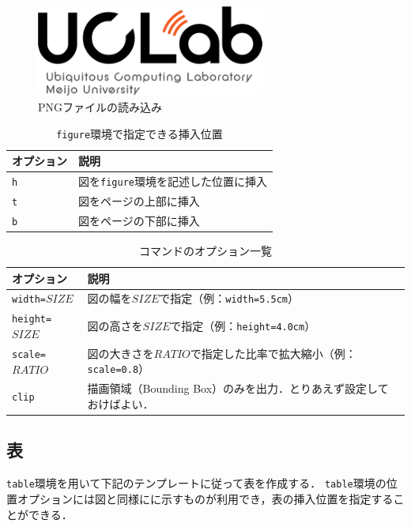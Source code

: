 \documentclass[a4j,11pt]{ujreport}
\begin{document}
\begin{figure}[ht]
	\centering
	\includegraphics[clip,height=3.0cm]{fig/logo.png}
	\caption{PNGファイルの読み込み}
	\label{fig:ExamplePNG}
\end{figure}

\begin{table}[ht]
	\centering
	\caption{\texttt{figure}環境で指定できる挿入位置}
	\label{tab:FigureOptions}
	\small
	\begin{tabular}{l|l}
		\Hline 
		オプション & 説明 \\ 
		\hline\hline
		\texttt{h} & 図を\texttt{figure}環境を記述した位置に挿入\\
		\texttt{t} & 図をページの上部に挿入\\
		\texttt{b} & 図をページの下部に挿入\\
		\hline 
	\end{tabular} 
\end{table}

\begin{table}[ht]
	\centering
	\caption{コマンドのオプション一覧}
	\label{tab:IncludegraphicsOptions}
	\small
	\begin{tabular}{l|l}
		\Hline 
		オプション & 説明 \\ 
		\hline\hline
		\texttt{width=}$SIZE$ & 図の幅を$SIZE$で指定（例：\texttt{width=5.5cm}）\\
		\texttt{height=}$SIZE$ & 図の高さを$SIZE$で指定（例：\texttt{height=4.0cm}）\\
		\texttt{scale=}$RATIO$ & 図の大きさを$RATIO$で指定した比率で拡大縮小（例：\texttt{scale=0.8}）\\
		\texttt{clip} & 描画領域（Bounding Box）のみを出力．とりあえず設定しておけばよい．\\
		\hline 
	\end{tabular} 
\end{table}

\subsection{表}

\texttt{table}環境を用いて下記のテンプレートに従って表を作成する．
\texttt{table}環境の位置オプションには図と同様にに示すものが利用でき，表の挿入位置を指定することができる．
\end{document}
